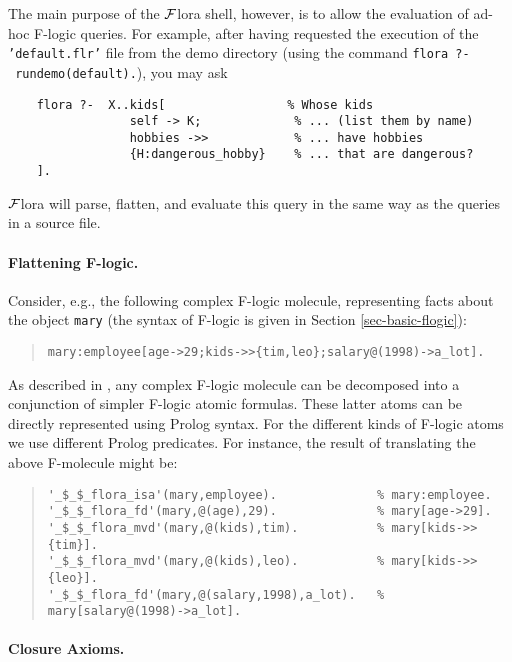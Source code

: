 \documentclass[11pt]{article}
\newcommand{\FLORA}{{\mbox{${\cal F}${\sc lora}}}\xspace}
\newcommand{\fl}{{F-logic}\xspace}
\begin{document}
The main purpose of the \FLORA shell, however, is to allow the evaluation
of ad-hoc F-logic queries. For example, after having requested the
execution of the \texttt{'default.flr'} file from the demo directory (using
the command \texttt{flora~?-~rundemo(default).}), you may ask
\begin{verbatim}
    flora ?-  X..kids[                 % Whose kids
                 self -> K;             % ... (list them by name)
                 hobbies ->>            % ... have hobbies
                 {H:dangerous_hobby}    % ... that are dangerous?
    ]. 
\end{verbatim}
\FLORA will parse, flatten, and evaluate this query in the same way as
the queries in a source file.


\paragraph{Flattening F-logic.}

Consider, e.g., the following complex F-logic molecule, representing
facts about the object \texttt{mary} (the syntax of \fl is given in
Section \ref{sec-basic-flogic}):

\begin{quote}
{\small\begin{verbatim}
mary:employee[age->29;kids->>{tim,leo};salary@(1998)->a_lot].
\end{verbatim}}
\end{quote}

As described in \cite{KLW95}, any complex F-logic molecule can be
decomposed into a conjunction of simpler F-logic atomic formulas. These
latter atoms can be directly represented using Prolog syntax.  For the
different kinds of F-logic atoms we use different Prolog predicates. For
instance, the result of translating the above F-molecule might be:

\begin{quote}
{\small
\begin{verbatim}
'_$_$_flora_isa'(mary,employee).              % mary:employee.
'_$_$_flora_fd'(mary,@(age),29).              % mary[age->29].
'_$_$_flora_mvd'(mary,@(kids),tim).           % mary[kids->>{tim}].
'_$_$_flora_mvd'(mary,@(kids),leo).           % mary[kids->>{leo}].
'_$_$_flora_fd'(mary,@(salary,1998),a_lot).   % mary[salary@(1998)->a_lot].
\end{verbatim}
  }
\end{quote}



\paragraph{Closure Axioms.}
\end{document}
